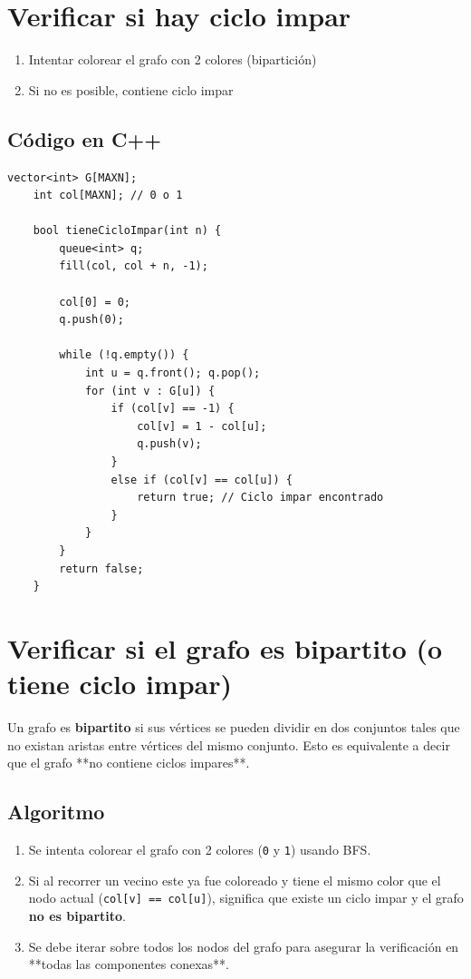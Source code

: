 \section{Verificar si hay ciclo impar}

\begin{enumerate}
	\item Intentar colorear el grafo con 2 colores (bipartición)
	\item Si no es posible, contiene ciclo impar
\end{enumerate}

\subsection*{Código en C++}

\begin{lstlisting}[caption=Detectar ciclo impar]
	vector<int> G[MAXN];
	int col[MAXN]; // 0 o 1
	
	bool tieneCicloImpar(int n) {
		queue<int> q;
		fill(col, col + n, -1);
		
		col[0] = 0;
		q.push(0);
		
		while (!q.empty()) {
			int u = q.front(); q.pop();
			for (int v : G[u]) {
				if (col[v] == -1) {
					col[v] = 1 - col[u];
					q.push(v);
				}
				else if (col[v] == col[u]) {
					return true; // Ciclo impar encontrado
				}
			}
		}
		return false;
	}
\end{lstlisting}

\section{Verificar si el grafo es bipartito (o tiene ciclo impar)}

Un grafo es \textbf{bipartito} si sus vértices se pueden dividir en dos conjuntos tales que no existan aristas entre vértices del mismo conjunto. Esto es equivalente a decir que el grafo **no contiene ciclos impares**.

\subsection*{Algoritmo}
\begin{enumerate}
    \item Se intenta colorear el grafo con 2 colores (\texttt{0} y \texttt{1}) usando BFS.
    \item Si al recorrer un vecino este ya fue coloreado y tiene el mismo color que el nodo actual (\texttt{col[v] == col[u]}), significa que existe un ciclo impar y el grafo \textbf{no es bipartito}.
    \item Se debe iterar sobre todos los nodos del grafo para asegurar la verificación en **todas las componentes conexas**.
\end{enumerate}

